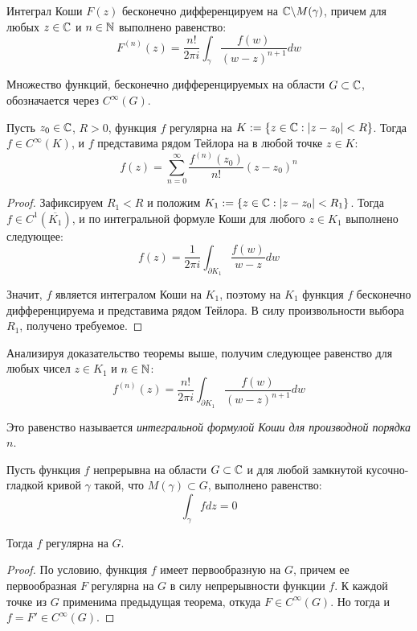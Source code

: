 \begin{corollary}
	Интеграл Коши $F(z)$ бесконечно дифференцируем на $\mathbb{C} \backslash M(\gamma)$, причем для любых $z \in \mathbb{C}$ и $n \in \mathbb{N}$ выполнено равенство:
	\[F^{(n)}(z) = \frac{n!}{2\pi i} \int_\gamma\frac{f(w)}{(w-z)^{n + 1}}dw\]
\end{corollary}

\begin{definition}
	Множество функций, бесконечно дифференцируемых на области $G \subset \mathbb{C}$, обозначается через $C^\infty(G)$.
\end{definition}

\begin{theorem}
	Пусть $z_0 \in \mathbb{C}$, $R > 0$, функция $f$ регулярна на $K := \{z \in \mathbb{C} : |z - z_0| < R\}$. Тогда $f \in C^\infty(K)$, и $f$ представима рядом Тейлора на в любой точке $z \in K$:
	\[f(z) = \sum_{n = 0}^\infty \frac{f^{(n)}(z_0)}{n!}(z - z_0)^n\]
\end{theorem}

\begin{proof}
	Зафиксируем $R_1 < R$ и положим $K_1 := \{z \in \mathbb{C}: |z - z_0| < R_1\}$. Тогда $f \in C^1(\overline{K_1})$, и по интегральной формуле Коши для любого $z \in K_1$ выполнено следующее:
	\[f(z) = \frac{1}{2\pi i}\int_{\partial K_1}\frac{f(w)}{w - z}dw\]
	
	Значит, $f$ является интегралом Коши на $K_1$, поэтому на $K_1$ функция $f$ бесконечно дифференцируема и представима рядом Тейлора. В силу произвольности выбора $R_1$, получено требуемое.
\end{proof}

\begin{note}
	Анализируя доказательство теоремы выше, получим следующее равенство для любых чисел $z \in K_1$ и $n \in \mathbb{N}$:
	\[f^{(n)}(z) = \frac{n!}{2\pi i}\int_{\partial K_1}\frac{f(w)}{(w - z)^{n+1}}dw\]
	
	Это равенство называется \textit{интегральной формулой Коши для производной порядка $n$}.
\end{note}

\begin{theorem}[Мореры]
	Пусть функция $f$ непрерывна на области $G \subset \mathbb{C}$ и для любой замкнутой кусочно-гладкой кривой $\gamma$ такой, что $M(\gamma) \subset G$, выполнено равенство:
	\[\int_\gamma fdz = 0\]
	
	Тогда $f$ регулярна на $G$.
\end{theorem}

\begin{proof}
	По условию, функция $f$ имеет первообразную на $G$, причем ее первообразная $F$ регулярна на $G$ в силу непрерывности функции $f$. К каждой точке из $G$ применима предыдущая теорема, откуда $F \in C^\infty(G)$. Но тогда и $f = F' \in C^\infty(G)$.
\end{proof}

